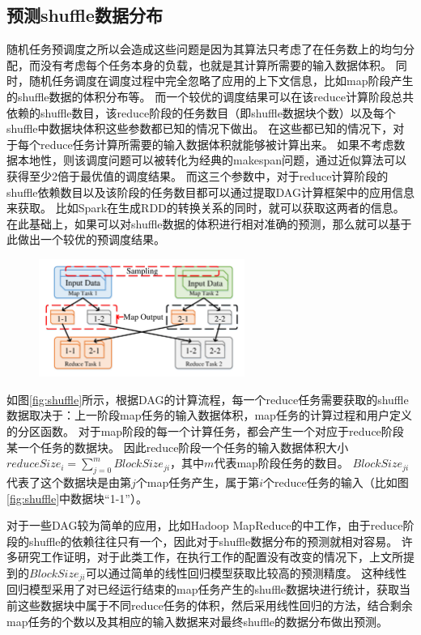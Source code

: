\subsection{预测shuffle数据分布}

随机任务预调度之所以会造成这些问题是因为其算法只考虑了在任务数上的均匀分配，而没有考虑每个任务本身的负载，也就是其计算所需要的输入数据体积。
同时，随机任务调度在调度过程中完全忽略了应用的上下文信息，比如map阶段产生的shuffle数据的体积分布等。
而一个较优的调度结果可以在该reduce计算阶段总共依赖的shuffle数目，该reduce阶段的任务数目（即shuffle数据块个数）以及每个shuffle中数据块体积这些参数都已知的情况下做出。
在这些都已知的情况下，对于每个reduce任务计算所需要的输入数据体积就能够被计算出来。
如果不考虑数据本地性，则该调度问题可以被转化为经典的makespan问题，通过近似算法可以获得至少2倍于最优值的调度结果\cite{approximation}。
而这三个参数中，对于reduce计算阶段的shuffle依赖数目以及该阶段的任务数目都可以通过提取DAG计算框架中的应用信息来获取。
比如Spark在生成RDD的转换关系的同时，就可以获取这两者的信息\cite{spark}。
在此基础上，如果可以对shuffle数据的体积进行相对准确的预测，那么就可以基于此做出一个较优的预调度结果。

\begin{figure}[!htp]
	\centering
	\includegraphics[width=0.6\textwidth]{../../PPoPP-2018/fig/shuffle.pdf}
\end{figure}

如图\ref{fig:shuffle}所示，根据DAG的计算流程，每一个reduce任务需要获取的shuffle数据取决于：上一阶段map任务的输入数据体积，map任务的计算过程和用户定义的分区函数。
对于map阶段的每一个计算任务，都会产生一个对应于reduce阶段某一个任务的数据块。
因此reduce阶段一个任务的输入数据体积大小$reduceSize_i = \sum_{j=0}^{m} {BlockSize_{ji}}$，其中$m$代表map阶段任务的数目。
$BlockSize_{ji}$代表了这个数据块是由第$j$个map任务产生，属于第$i$个reduce任务的输入（比如图\ref{fig:shuffle}中数据块“1-1”）。

对于一些DAG较为简单的应用，比如Hadoop MapReduce的中工作\cite{hadoop}，由于reduce阶段的shuffle的依赖往往只有一个，因此对于shuffle数据分布的预测就相对容易。
许多研究工作证明，对于此类工作，在执行工作的配置没有改变的情况下，上文所提到的$BlockSize_{ji}$可以通过简单的线性回归模型获取比较高的预测精度\cite{ishuffle, predict}。
这种线性回归模型采用了对已经运行结束的map任务产生的shuffle数据块进行统计，获取当前这些数据块中属于不同reduce任务的体积，然后采用线性回归的方法，结合剩余map任务的个数以及其相应的输入数据来对最终shuffle的数据分布做出预测。

